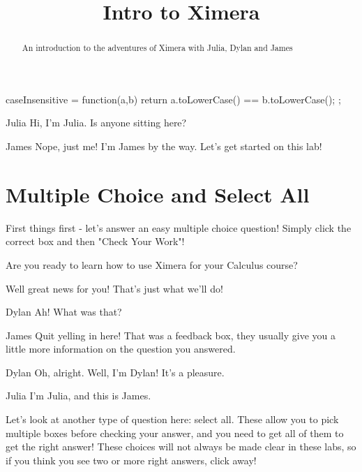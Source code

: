 \documentclass{ximera}
\title{Intro to Ximera}
\begin{document}
\maketitle
\begin{abstract}
An introduction to the adventures of Ximera with Julia, Dylan and James
\end{abstract}
\begin{javascript}
 caseInsensitive = function(a,b) {
    return a.toLowerCase() == b.toLowerCase();
  };
\end{javascript}

\begin{dialogue}
\item[Julia] Hi, I'm Julia. Is anyone sitting here?
\item[James] Nope, just me! I'm James by the way. Let's get started on this lab!
\end{dialogue}

\section{Multiple Choice and Select All}
First things first - let's answer an easy multiple choice question! Simply click the correct box and then "Check Your Work"!

\begin{question}
Are you ready to learn how to use Ximera for your Calculus course?

\begin{multipleChoice}
\end{multipleChoice}
\begin{feedback}[correct]
Well great news for you! That's just what we'll do!
\end{feedback}

\end{question}
\begin{dialogue}
\item[Dylan] Ah! What was that?
\item[James] Quit yelling in here! That was a feedback box, they usually give you a little more information on the question you answered.
\item[Dylan] Oh, alright. Well, I'm Dylan! It's a pleasure.
\item[Julia] I'm Julia, and this is James.
\end{dialogue}

Let's look at another type of question here: select all. These allow you to pick multiple boxes before checking your answer, and you need to get all of them to get the right answer! These choices will not always be made clear in these labs, so if you think you see two or more right answers, click away!
\end{document}
